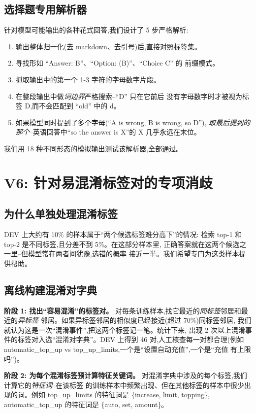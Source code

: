 \documentclass[10pt,twocolumn,letterpaper]{article}
\begin{document}
\subsection{选择题专用解析器}
针对模型可能输出的各种花式回答,我们设计了 5 步严格解析:
\begin{enumerate}[leftmargin=*,itemsep=1pt,topsep=2pt]
\item 输出整体归一化(去 markdown、去引号)后,直接对照标签集。
\item 寻找形如 ``Answer: B''、``Option: (B)''、``Choice C'' 的
  前缀模式。
\item 抓取输出中的第一个 1-3 字符的字母数字片段。
\item 在整段输出中做\emph{词边界}严格搜索--``D'' 只在它前后
  没有字母数字时才被视为标签 D,而不会匹配到 ``old'' 中的 d。
\item 如果模型同时提到了多个字母(``A is wrong, B is wrong, so D''),
  \emph{取最后提到的那个}--英语回答中``so the answer is X''的
  X 几乎永远在末位。
\end{enumerate}
我们用 18 种不同形态的模拟输出测试该解析器,全部通过。

\section{V6: 针对易混淆标签对的专项消歧}
\label{sec:v6}

\subsection{为什么单独处理混淆标签}
DEV 上大约有 10\% 的样本属于``两个候选标签难分高下''的情况:
检索 top-1 和 top-2 是不同标签,且分差不到 5\%。在这部分样本里,
正确答案就在这两个候选之一里--但模型常在两者间犹豫,选错的概率
接近一半。我们希望专门为这类样本提供帮助。

\subsection{离线构建混淆对字典}
\textbf{阶段 1: 找出``容易混淆''的标签对。}
对每条训练样本,找它最近的\emph{同标签}邻居和最近的\emph{异标签}
邻居。如果异标签邻居的相似度已经接近(超过 70\%)同标签邻居,
我们就认为这是一次``混淆事件'',把这两个标签记一笔。统计下来,
出现 2 次以上混淆事件的标签对入选``混淆对字典''。DEV 上得到 46
对,人工核查每一对都合理(例如 automatic\_top\_up vs
top\_up\_limits,一个是``设置自动充值'',一个是``充值
有上限吗'')。

\textbf{阶段 2: 为每个混淆标签预计算特征关键词。}
对混淆字典中涉及的每个标签,我们计算它的\emph{特征词}--在该标签
的训练样本中频繁出现、但在其他标签的样本中很少出现的词。例如
top\_up\_limits 的特征词是 \{increase, limit, topping\},
automatic\_top\_up 的特征词是 \{auto, set, amount\}。
\end{document}
